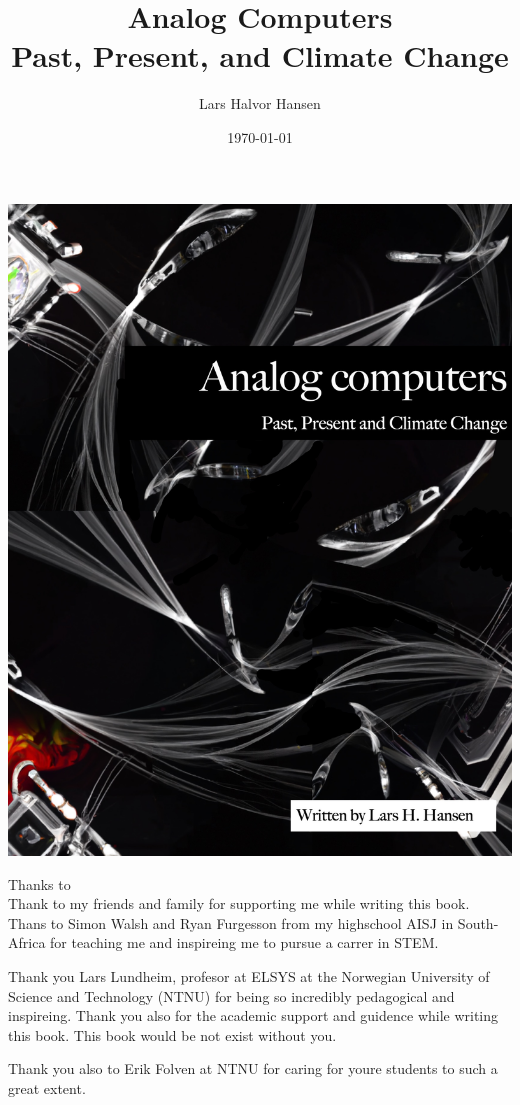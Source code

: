 \documentclass{report}
\title{Analog Computers \\ 
    \Large{Past, Present, and Climate Change}}
\author{Lars Halvor Hansen}
\date{\today}
\begin{document}
\includegraphics[scale=0.4]{ACPPCbookCover.jpg}
\pagestyle{classicbookstyle} %



\newpage
\maketitle
\tableofcontents
\newpage
\Large{Thanks to}\\
Thank to my friends and family for supporting me while writing this book. Thans to Simon Walsh and Ryan Furgesson from my highschool AISJ in South-Africa for teaching me and inspireing me to pursue a carrer in STEM. 

Thank you Lars Lundheim, profesor at ELSYS at the Norwegian University of Science and Technology (NTNU) for being so incredibly pedagogical and inspireing. Thank you also for the academic support and guidence while writing this book. This book would be not exist without you. 

Thank you also to Erik Folven at NTNU for caring for youre students to such a great extent. 
\end{document}
